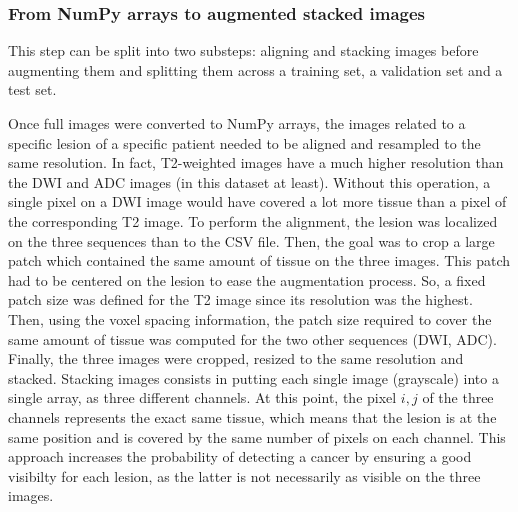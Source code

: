 \newpage

\subsubsection{From NumPy arrays to augmented stacked images}
\label{sec:numpyToAugmentedStacked}
\setlength{\marginparwidth}{3cm}\leavevmode {}This step can be split into two substeps: aligning and stacking images before augmenting them and splitting them across a training set, a validation set and a test set.

Once full images were converted to NumPy arrays, the images related to a specific lesion of a specific patient needed to be aligned and resampled to the same resolution. In fact, T2-weighted images have a much higher resolution than the DWI and ADC images (in this dataset at least). Without this operation, a single pixel on a DWI image would have covered a lot more tissue than a pixel of the corresponding T2 image. To perform the alignment, the lesion was localized on the three sequences than to the CSV file. Then, the goal was to crop a large patch which contained the same amount of tissue on the three images. This patch had to be centered on the lesion to ease the augmentation process. So, a fixed patch size was defined for the T2 image since its resolution was the highest. Then, using the voxel spacing information, the patch size required to cover the same amount of tissue was computed for the two other sequences (DWI, ADC). Finally, the three images were cropped, resized to the same resolution and stacked. Stacking images consists in putting each single image (grayscale) into a single array, as three different channels. At this point, the pixel $i,j$ of the three channels represents the exact same tissue, which means that the lesion is at the same position and is covered by the same number of pixels on each channel. This approach increases the probability of detecting a cancer by ensuring a good visibilty for each lesion, as the latter is not necessarily as visible on the three images.

